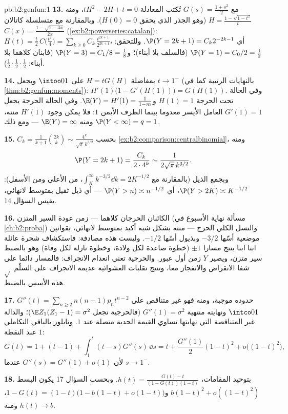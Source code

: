 \begin{solution}{pb:b2:genfun:1}
\textbf{13.} مع $G(s) = \frac{1 + s^2}2$ تُكتب المعادلة $tH^2 - 2H + t = 0$، ومنه $H = \frac{1 - \sqrt{1 - t^2}}{t}$ (وهو
الجذر الذي يحقق $H(0) = 0$). وبالمقارنة مع متسلسلة كاتالان $C(x) = \frac{1 - \sqrt{1 - 4x}}{2x}$
(\cref{ex:b2:powerseries:catalan}): $H(t) = \frac
t2\,C\bigl(\frac{t^2}4\bigr) =
\sum_{k\geq0}C_k\,\frac{t^{2k+1}}{2^{2k+1}}$، أي $\P(Y =
2k+1) = C_k2^{-2k-1}$. وللتحقق: $\P(Y = 1) = C_0/2 = \frac12$ (فالسلف بلا أبناء)؛
و$\P(Y = 3) = C_1/8 = \frac18$ (فابنان كلاهما بلا أبناء: $\frac12\cdot\frac12\cdot
\frac12$).

\textbf{14.} بمفاضلة $H = tG(H)$ على $\intoo01$ وبجعل $t \to 1^-$ (بالنهايات
الرتيبة كما في \cref{thm:b2:genfun:moments}): $H'(1)\bigl(1 - G'(H(1))\bigr)
= G(H(1))$. وفي الحالة تحت الحرجة $H(1) = 1$
و$\E(Y) =
H'(1) = \frac1{1 - m}$. وفي الحالة الحرجة يجعل $G'(1) = 1$ العامل الأيسر معدوما بينما
الطرف الأيمن $1$: فلا يمكن وجود $H'(1)$ منته، ومنه $\E(Y) = \infty$ ---
ومع ذلك $\P(Y <
\infty) = q = 1$.

\textbf{15.} $C_k = \frac1{k+1}\binom{2k}k \sim
\frac{4^k}{\sqrt\pi\,k^{3/2}}$ بحسب \cref{ex:b2:comparison:centralbinomial}، ومنه
\[
\P(Y = 2k+1) = \frac{C_k}{2\cdot4^{k}} \sim
\frac1{2\sqrt\pi\,k^{3/2}} .
\]
وبجمع الذيل (بالمقارنة مع $\int_K^\infty
k^{-3/2}\dd k = 2K^{-1/2}$، من الأعلى ومن الأسفل): $\P(Y > 2K)
\asymp K^{-1/2}$،
أي $\P(Y > n) \asymp n^{-1/2}$ --- أي ذيل ثقيل بمتوسط لانهائي، يقيس السؤال 14.

\textbf{16.} الكائنان الحرجان كلاهما --- زمن عودة السير المتزن
(مسألة نهاية الأسبوع في \cref{ch:b2:proba}) والنسل الكلي الحرج --- منته بشكل
شبه أكيد بمتوسط لانهائي، بقوانين موضعية أسّها $-3/2$ وبذيول أسّها
$-1/2$. وليست هذه مصادفة: فاستكشاف شجرة عائلة ابنا ابنا ينتج مسارا
$\pm1$ (خطوة صاعدة لكل ولادة، وخطوة نازلة لكل وفاة) وهو بالضبط سير
متزن، ويصير $Y$ زمن أول عبور. والحرجية تعني انعدام الانجراف:
فالمسار دائما على شفا الانقراض والانفجار معا، وتنتج تقلبات العشوائية
عديمة الانجراف على السلّم $\sqrt{}$ هذه الأسس بالضبط.

\textbf{17.} $G''(t) = \sum_{n\geq2}n(n-1)p_nt^{n-2}$ حدوده موجبة، ومنه فهو غير متناقص على $\intco01$
ونهايته منتهية $G''(1) = \sigma^2$ (فالحرجية تجعل $\E Z_1(Z_1 - 1) = \sigma^2$)؛ والدالة غير المتناقصة
التي نهايتها تساوي القيمة الحدية متصلة عند $1$. وتايلور بالباقي
التكاملي عند النقطة $1$:
\[
G(t) = 1 + (t - 1) + \int_1^t(t - s)G''(s)\,\dd s
= t + \frac{G''(1)}2(1-t)^2 + o\bigl((1-t)^2\bigr),
\]
لأن $G''(s) = G''(1) + o(1)$ عندما $s \to 1^-$.

\textbf{18.} بتوحيد المقامات، $h(t) =
\frac{G(t) - t}{(1 - G(t))(1 - t)}$. وبحسب السؤال 17 يكون البسط
$b(1-t)^2 + o((1-t)^2)$ و$1 - G(t) = (1 -
t)\bigl(1 - b(1-t) + o(1-t)\bigr)$، ومنه $h(t) \to b$.


\end{solution}
